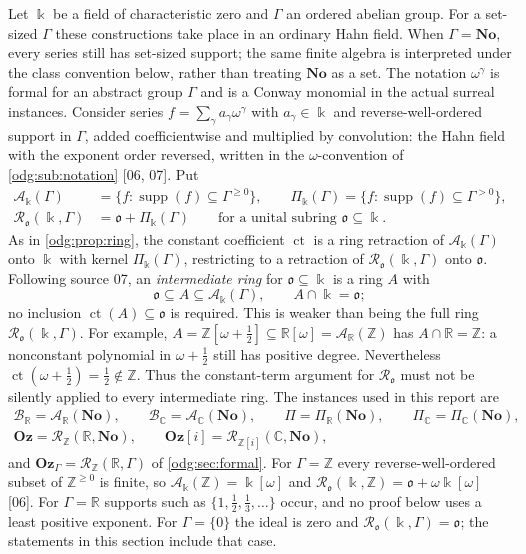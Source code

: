 \documentclass[11pt,oneside]{article}
\numberwithin{equation}{section}
\theoremstyle{definition}
\theoremstyle{remark}
\newcommand{\No}{\mathbf{No}}
\newcommand{\Oz}{\mathbf{Oz}}
\newcommand{\Z}{\mathbb Z}
\newcommand{\R}{\mathbb R}
\newcommand{\C}{\mathbb C}
\newcommand{\BR}{\mathcal B_{\R}}
\newcommand{\BC}{\mathcal B_{\C}}
\newcommand{\ct}{\operatorname{ct}}
\newcommand{\supp}{\operatorname{supp}}
\newcommand{\src}[1]{\textup{\textsf{\small[#1]}}}
\newcommand{\Og}{\Oz[i]}
\begin{document}
Let $\Bbbk$ be a field of characteristic zero and $\Gamma$ an ordered abelian
group. For a set-sized $\Gamma$ these constructions take place in an
ordinary Hahn field. When $\Gamma=\No$, every series still has set-sized
support; the same finite algebra is interpreted under the class convention
below, rather than treating $\No$ as a set. The notation $\omega^\gamma$ is
formal for an abstract group $\Gamma$ and is a Conway monomial in the actual
surreal instances. Consider series $f=\sum_\gamma a_\gamma\omega^\gamma$ with
$a_\gamma\in\Bbbk$ and reverse-well-ordered support in $\Gamma$, added
coefficientwise and multiplied by convolution: the Hahn field with the
exponent order reversed, written in the $\omega$-convention of
\cref{odg:sub:notation} \src{06, 07}. Put
\begin{align*}
 \mathcal A_\Bbbk(\Gamma)&=\{f:\supp(f)\subseteq\Gamma^{\ge0}\},\qquad
 \Pi_\Bbbk(\Gamma)=\{f:\supp(f)\subseteq\Gamma^{>0}\},\\
 \mathcal R_{\mathfrak o}(\Bbbk,\Gamma)&=\mathfrak o+\Pi_\Bbbk(\Gamma)
 \qquad\text{for a unital subring }\mathfrak o\subseteq\Bbbk .
\end{align*}
As in \cref{odg:prop:ring}, the constant coefficient $\ct$ is a ring
retraction of $\mathcal A_\Bbbk(\Gamma)$ onto $\Bbbk$ with kernel
$\Pi_\Bbbk(\Gamma)$, restricting to a retraction of
$\mathcal R_{\mathfrak o}(\Bbbk,\Gamma)$ onto $\mathfrak o$. Following source
07, an \emph{intermediate ring} for $\mathfrak o\subseteq\Bbbk$ is a ring $A$
with
\begin{equation}\label{odg:def:eq:intermediate}
 \mathfrak o\subseteq A\subseteq\mathcal A_\Bbbk(\Gamma),\qquad
 A\cap\Bbbk=\mathfrak o ;
\end{equation}
no inclusion $\ct(A)\subseteq\mathfrak o$ is required. This is weaker than
being the full ring $\mathcal R_{\mathfrak o}(\Bbbk,\Gamma)$. For example,
$A=\Z[\omega+\tfrac12]\subseteq\R[\omega]=\mathcal A_\R(\Z)$ has
$A\cap\R=\Z$: a nonconstant polynomial in $\omega+\tfrac12$ still has
positive degree. Nevertheless $\ct(\omega+\tfrac12)=\tfrac12\notin\Z$.
Thus the constant-term argument for $\mathcal R_{\mathfrak o}$ must not be
silently applied to every intermediate ring. The instances used in
this report are
\begin{gather*}
 \BR=\mathcal A_\R(\No),\qquad \BC=\mathcal A_\C(\No),\qquad
 \Pi=\Pi_\R(\No),\qquad \Pi_{\C}=\Pi_\C(\No),\\
 \Oz=\mathcal R_\Z(\R,\No),\qquad \Og=\mathcal R_{\Z[i]}(\C,\No),
\end{gather*}
and $\Oz_\Gamma=\mathcal R_\Z(\R,\Gamma)$ of \cref{odg:sec:formal}. For
$\Gamma=\Z$ every reverse-well-ordered subset of $\Z^{\ge0}$ is finite, so
$\mathcal A_\Bbbk(\Z)=\Bbbk[\omega]$ and
$\mathcal R_{\mathfrak o}(\Bbbk,\Z)=\mathfrak o+\omega\Bbbk[\omega]$ \src{06}.
For $\Gamma=\R$ supports such as $\{1,\frac12,\frac13,\ldots\}$ occur, and no
proof below uses a least positive exponent. For $\Gamma=\{0\}$ the ideal
is zero and $\mathcal R_{\mathfrak o}(\Bbbk,\Gamma)=\mathfrak o$; the
statements in this section include that case.
\end{document}
